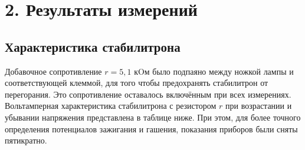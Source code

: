 \documentclass[14pt,a4paper]{article}
\begin{document}
\begin{figure}[H]
\centering
{}
\qquad
{}
\end{figure}

\section*{2. Результаты измерений}

\subsection*{Характеристика стабилитрона}

Добавочное сопротивление $r = 5,1$ кOм было подпаяно между ножкой лампы и соответствующей клеммой, для того чтобы предохранять стабилитрон от перегорания. Это сопротивление оставалось включённым при всех измерениях. Вольтамперная характеристика стабилитрона с резистором $r$ при возрастании и убывании напряжения представлена в таблице ниже. При этом, для более точного определения потенциалов зажигания и гашения, показания приборов были сняты пятикратно.
\end{document}
